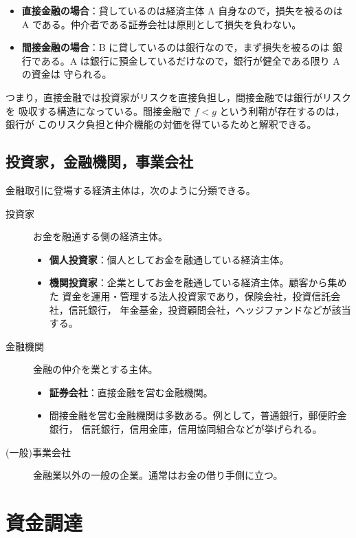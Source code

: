 \begin{keypoint}
\begin{itemize}
\item \textbf{直接金融の場合}：貸しているのは経済主体 A 自身なので，損失を被るのは
A である。仲介者である証券会社は原則として損失を負わない。
\item \textbf{間接金融の場合}：B に貸しているのは銀行なので，まず損失を被るのは
銀行である。A は銀行に預金しているだけなので，銀行が健全である限り A の資金は
守られる。
\end{itemize}
つまり，直接金融では投資家がリスクを直接負担し，間接金融では銀行がリスクを
吸収する構造になっている。間接金融で $f<g$ という利鞘が存在するのは，銀行が
このリスク負担と仲介機能の対価を得ているためと解釈できる。
\end{keypoint}

\subsection{投資家，金融機関，事業会社}

金融取引に登場する経済主体は，次のように分類できる。

\begin{description}
\item[投資家] お金を融通する側の経済主体。
  \begin{itemize}
  \item \textbf{個人投資家}：個人としてお金を融通している経済主体。
  \item \textbf{機関投資家}：企業としてお金を融通している経済主体。顧客から集めた
  資金を運用・管理する法人投資家であり，保険会社，投資信託会社，信託銀行，
  年金基金，投資顧問会社，ヘッジファンドなどが該当する。
  \end{itemize}
\item[金融機関] 金融の仲介を業とする主体。
  \begin{itemize}
  \item \textbf{証券会社}：直接金融を営む金融機関。
  \item 間接金融を営む金融機関は多数ある。例として，普通銀行，郵便貯金銀行，
  信託銀行，信用金庫，信用協同組合などが挙げられる。
  \end{itemize}
\item[(一般)事業会社] 金融業以外の一般の企業。通常はお金の借り手側に立つ。
\end{description}

\section{資金調達}

